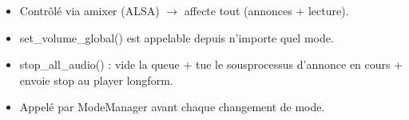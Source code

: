 \documentclass[letterpaper,10pt,french]{sphinxmanual}
\begin{document}
\begin{description}
\begin{itemize}
\item {} 
\sphinxAtStartPar
Contrôlé via amixer (ALSA) \(\rightarrow\) affecte tout (annonces + lecture).

\item {} 
\sphinxAtStartPar
set\_volume\_global() est appelable depuis n’importe quel mode.

\end{itemize}

\begin{itemize}
\item {} 
\sphinxAtStartPar
stop\_all\_audio() : vide la queue + tue le sous\sphinxhyphen{}processus d’annonce
en cours + envoie stop au player long\sphinxhyphen{}form.

\item {} 
\sphinxAtStartPar
Appelé par ModeManager avant chaque changement de mode.

\end{itemize}

\end{description}
\end{document}

